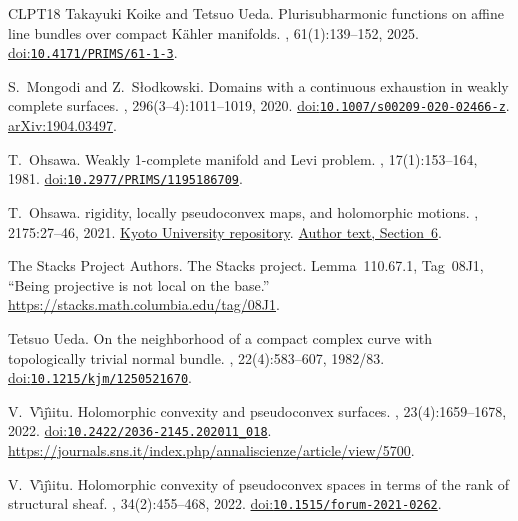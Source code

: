 \documentclass[11pt]{amsart}
\theoremstyle{definition}
\theoremstyle{remark}
\numberwithin{equation}{section}
\begin{document}
\begin{thebibliography}{CLPT18}
Takayuki Koike and Tetsuo Ueda.
\newblock Plurisubharmonic functions on affine line bundles over compact {K\"ahler} manifolds.
, 61(1):139--152, 2025.
\newblock \href{https://doi.org/10.4171/PRIMS/61-1-3}{doi:\nolinkurl{10.4171/PRIMS/61-1-3}}.

S.~Mongodi and Z.~S{\l}odkowski.
\newblock Domains with a continuous exhaustion in weakly complete surfaces.
, 296(3--4):1011--1019, 2020.
\newblock \href{https://doi.org/10.1007/s00209-020-02466-z}{doi:\nolinkurl{10.1007/s00209-020-02466-z}}. \href{https://arxiv.org/abs/1904.03497}{arXiv:1904.03497}.

T.~Ohsawa.
\newblock Weakly 1-complete manifold and {Levi} problem.
, 17(1):153--164, 1981.
\newblock \href{https://doi.org/10.2977/PRIMS/1195186709}{doi:\nolinkurl{10.2977/PRIMS/1195186709}}.

T.~Ohsawa.
 rigidity, locally pseudoconvex maps, and holomorphic motions.
, 2175:27--46, 2021.
\newblock \href{https://hdl.handle.net/2433/263965}{Kyoto University repository}.
\href{https://www.kurims.kyoto-u.ac.jp/~kyodo/kokyuroku/contents/pdf/2175-03.pdf}{Author text, Section~6}.

{The Stacks Project Authors}.
\newblock The {Stacks} project.
\newblock Lemma~110.67.1, Tag~08J1, ``Being projective is not local on the base.'' \url{https://stacks.math.columbia.edu/tag/08J1}.

Tetsuo Ueda.
\newblock On the neighborhood of a compact complex curve with topologically trivial normal bundle.
, 22(4):583--607, 1982/83.
\newblock \href{https://doi.org/10.1215/kjm/1250521670}{doi:\nolinkurl{10.1215/kjm/1250521670}}.

V.~V{\^\i}j{\^\i}itu.
\newblock Holomorphic convexity and pseudoconvex surfaces.
, 23(4):1659--1678, 2022.
\newblock \href{https://doi.org/10.2422/2036-2145.202011_018}{doi:\nolinkurl{10.2422/2036-2145.202011_018}}. \url{https://journals.sns.it/index.php/annaliscienze/article/view/5700}.

V.~V{\^\i}j{\^\i}itu.
\newblock Holomorphic convexity of pseudoconvex spaces in terms of the rank of structural sheaf.
, 34(2):455--468, 2022.
\newblock \href{https://doi.org/10.1515/forum-2021-0262}{doi:\nolinkurl{10.1515/forum-2021-0262}}.


\end{thebibliography}
\end{document}
